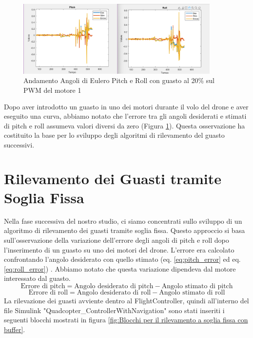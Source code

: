 \begin{figure}[H]  %
    \centering
    \includegraphics[width=0.9\textwidth]{pitch_roll.png}
    \caption{Andamento Angoli di Eulero Pitch e Roll con guasto al 20\% sul PWM del motore 1}
    \label{fig:pitch_roll}
\end{figure}

\noindent
Dopo aver introdotto un guasto in uno dei motori durante il volo del drone e aver eseguito una curva, abbiamo notato che l'errore tra gli angoli desiderati e stimati di pitch e roll assumeva valori diversi da zero (Figura \ref{fig:pitch_roll}). 
\noindent
Questa osservazione ha costituito la base per lo sviluppo degli algoritmi di rilevamento del guasto successivi.

\section{Rilevamento dei Guasti tramite Soglia Fissa}

Nella fase successiva del nostro studio, ci siamo concentrati sullo sviluppo di un algoritmo di rilevamento dei guasti tramite soglia fissa. Questo approccio si basa sull'osservazione della variazione dell'errore degli angoli di pitch e roll dopo l'inserimento di un guasto su uno dei motori del drone. L'errore era calcolato confrontando l'angolo desiderato con quello stimato (eq. \ref{eq:pitch_error} ed eq. \ref{eq:roll_error}) . Abbiamo notato che questa variazione dipendeva dal motore interessato dal guasto.
\begin{equation}
\text{Errore di pitch} = \text{Angolo desiderato di pitch} - \text{Angolo stimato di pitch}
\label{eq:pitch_error}
\end{equation}
\begin{equation}
\text{Errore di roll} = \text{Angolo desiderato di roll} - \text{Angolo stimato di roll}
\label{eq:roll_error}
\end{equation}
\noindent
La rilevazione dei guasti avviente dentro al FlightController, quindi all'interno del file Simulink "Quadcopter\_ControllerWithNavigation" sono stati inseriti i seguenti blocchi mostrati in figura \ref{fig:Blocchi per il rilevamento a soglia fissa con buffer}.

